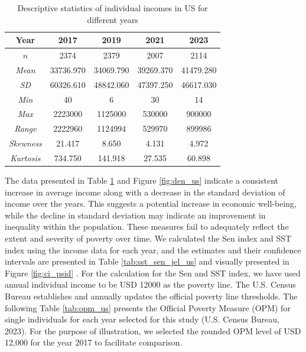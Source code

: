 \documentclass[11pt]{article}
\begin{document}
\begin{table}
    \centering
     \caption{Descriptive statistics of individual incomes in US for different years}
    \begin{tabular}{ccccc}
    \hline
    \hline
   Year   &  2017& 2019 & 2021& 2023 \\
        \hline
    \hline

      $n$   &2374   & 2379 & 2007 & 2114\\
      \textit{Mean}  & 33736.970  & 34069.790 &39269.370&41479.280 \\

      \textit{SD} & 60326.610 & 48842.060 & 47397.250&46617.030 \\
     \textit{ Min }& 40   &6 &30&14\\
      \textit{Max} &2223000 & 1125000   &530000&900000  \\
      \textit{Range} & 2222960& 1124994 & 529970&899986\\
      \textit{Skewness} & 21.417& 8.650& 4.131&4.972 \\
     \textit{Kurtosis} & 734.750 &141.918 &27.535&60.898\\
      \hline
    \end{tabular}
    \label{tab:des_us}
\end{table}


The data presented in Table \ref{tab:des_us} and Figure \ref{fig:den_us} indicate a consistent increase in average income along with a decrease in the standard deviation of income over the years. This suggests a potential increase in economic well-being, while the decline in standard deviation may indicate an improvement in inequality within the population. These measures fail to adequately reflect the extent and severity of poverty over time. We calculated the Sen index and SST index using the income data for each year, and the estimates and their confidence intervals  are presented in Table \ref{tab:sst_sen_jel_us} and visually presented in Figure \ref{fig:ci_psid} . For the calculation for the Sen and SST index, we have used annual individual income to be USD 12000 as the poverty line. The U.S. Census Bureau establishes and annually updates the official poverty line thresholds. The following Table \ref{tab:opm_us} presents the Official Poverty Measure (OPM) for single individuals for each year selected for this study (U.S. Census Bureau, 2023). For the purpose of illustration, we selected the rounded OPM level of USD 12,000 for the year 2017 to facilitate comparison.
\end{document}
